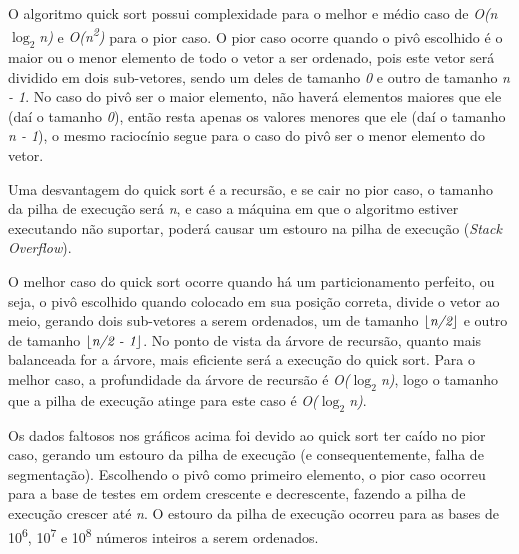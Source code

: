 \documentclass[fleqn,10pt]{SelfArx} %
\begin{document}

{\setlength{\parindent}{-0.5em}
}\newline


O algoritmo quick sort possui complexidade para o melhor e médio caso de \emph{O(n $\log_2$n)} e 
\emph{O(n\textsuperscript{2})} para o pior caso. O pior caso ocorre quando o pivô escolhido é o maior ou o menor 
elemento de todo o vetor a ser ordenado, pois este vetor será dividido em dois sub-vetores, sendo um deles de tamanho 
\emph{0} e outro de tamanho \emph{n - 1}. No caso do pivô ser o maior elemento, não haverá elementos maiores 
que ele (daí o tamanho \emph{0}), então resta apenas os valores menores que ele (daí o tamanho \emph{n - 1}), 
o mesmo raciocínio segue para o caso do pivô ser o menor elemento do vetor.

Uma desvantagem do quick sort é a recursão, e se cair no pior 
caso, o tamanho da pilha de execução será \emph{n}, e caso a máquina em que o algoritmo estiver executando não suportar, 
poderá causar um estouro na pilha de execução (\emph{Stack Overflow}).

O melhor caso do quick sort ocorre quando há um particionamento perfeito, ou seja, o pivô escolhido quando colocado em 
sua posição correta, divide o vetor ao meio, gerando dois sub-vetores a serem ordenados, um de tamanho 
$\lfloor\emph{n/2}\rfloor$ e outro de tamanho $\lfloor\emph{n/2 - 1}\rfloor$. No ponto de vista da árvore de recursão, 
quanto mais balanceada for a árvore, mais eficiente será a execução do quick sort. Para o melhor caso, a profundidade 
da árvore de recursão é \emph{O($\log_2$n)}, logo o tamanho que a pilha de execução atinge para este 
caso é \emph{O($\log_2$n)}.

Os dados faltosos nos gráficos acima foi devido ao quick sort ter caído no pior caso, gerando um estouro da pilha de 
execução (e consequentemente, falha de segmentação). Escolhendo o pivô como primeiro elemento, o pior caso ocorreu 
para a base de testes em ordem crescente e decrescente, fazendo a pilha de execução crescer até \emph{n}. 
O estouro da pilha de execução ocorreu para as bases de 10\textsuperscript{6}, 10\textsuperscript{7} e 
10\textsuperscript{8} números inteiros a serem ordenados.
\end{document}
